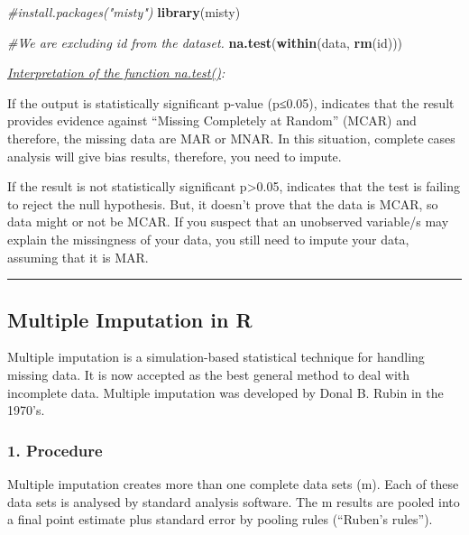 \documentclass[
]{article}
\newenvironment{Shaded}{\begin{snugshade}}{\end{snugshade}}
\newcommand{\CommentTok}[1]{\textcolor[rgb]{0.56,0.35,0.01}{\textit{#1}}}
\newcommand{\FunctionTok}[1]{\textcolor[rgb]{0.13,0.29,0.53}{\textbf{#1}}}
\newcommand{\NormalTok}[1]{#1}
\begin{document}
\begin{Shaded}
\begin{Highlighting}[]
\CommentTok{\#install.packages("misty")}
\FunctionTok{library}\NormalTok{(misty)}

\CommentTok{\#We are excluding \textquotesingle{}id\textquotesingle{} from the dataset.}
\FunctionTok{na.test}\NormalTok{(}\FunctionTok{within}\NormalTok{(data, }\FunctionTok{rm}\NormalTok{(id)))}
\end{Highlighting}
\end{Shaded}

\ul{\emph{Interpretation of the function na.test()}}\emph{:}

If the output is statistically significant p-value (p≤0.05), indicates
that the result provides evidence against ``Missing Completely at
Random'' (MCAR) and therefore, the missing data are MAR or MNAR. In this
situation, complete cases analysis will give bias results, therefore,
you need to impute.

If the result is not statistically significant p\textgreater0.05,
indicates that the test is failing to reject the null hypothesis. But,
it doesn't prove that the data is MCAR, so data might or not be MCAR. If
you suspect that an unobserved variable/s may explain the missingness of
your data, you still need to impute your data, assuming that it is MAR.

\begin{center}\rule{0.5\linewidth}{0.5pt}\end{center}

\hypertarget{multiple-imputation-in-r}{%
\subsection{Multiple Imputation in R}\label{multiple-imputation-in-r}}

Multiple imputation is a simulation-based statistical technique for
handling missing data. It is now accepted as the best general method to
deal with incomplete data. Multiple imputation was developed by Donal B.
Rubin in the 1970's.

\hypertarget{procedure}{%
\subsubsection{1. Procedure}\label{procedure}}

Multiple imputation creates more than one complete data sets (m). Each
of these data sets is analysed by standard analysis software. The m
results are pooled into a final point estimate plus standard error by
pooling rules (``Ruben's rules'').
\end{document}
